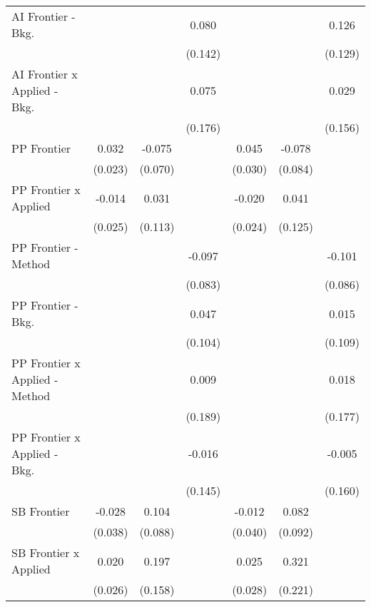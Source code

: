 \begin{tabular}{lcccccc}
   AI Frontier - Bkg.             &         &         & 0.080   &         &         & 0.126\\   
                                  &         &         & (0.142) &         &         & (0.129)\\   
   AI Frontier x Applied - Bkg.   &         &         & 0.075   &         &         & 0.029\\   
                                  &         &         & (0.176) &         &         & (0.156)\\   
   PP Frontier                    & 0.032   & -0.075  &         & 0.045   & -0.078  &   \\   
                                  & (0.023) & (0.070) &         & (0.030) & (0.084) &   \\   
   PP Frontier x Applied          & -0.014  & 0.031   &         & -0.020  & 0.041   &   \\   
                                  & (0.025) & (0.113) &         & (0.024) & (0.125) &   \\   
   PP Frontier - Method           &         &         & -0.097  &         &         & -0.101\\   
                                  &         &         & (0.083) &         &         & (0.086)\\   
   PP Frontier - Bkg.             &         &         & 0.047   &         &         & 0.015\\   
                                  &         &         & (0.104) &         &         & (0.109)\\   
   PP Frontier x Applied - Method &         &         & 0.009   &         &         & 0.018\\   
                                  &         &         & (0.189) &         &         & (0.177)\\   
   PP Frontier x Applied - Bkg.   &         &         & -0.016  &         &         & -0.005\\   
                                  &         &         & (0.145) &         &         & (0.160)\\   
   SB Frontier                    & -0.028  & 0.104   &         & -0.012  & 0.082   &   \\   
                                  & (0.038) & (0.088) &         & (0.040) & (0.092) &   \\   
   SB Frontier x Applied          & 0.020   & 0.197   &         & 0.025   & 0.321   &   \\   
                                  & (0.026) & (0.158) &         & (0.028) & (0.221) &   \\   

\end{tabular}
